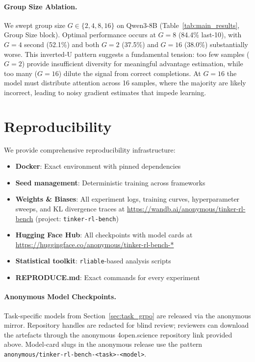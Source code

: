 \documentclass{article}
\begin{document}
\paragraph{Group Size Ablation.}
We swept group size $G \in \{2, 4, 8, 16\}$ on Qwen3-8B (Table~\ref{tab:main_results}, Group Size block).
Optimal performance occurs at $G{=}8$ (84.4\% last-10), with $G{=}4$ second (52.1\%) and both $G{=}2$ (37.5\%) and $G{=}16$ (38.0\%) substantially worse.
This inverted-U pattern suggests a fundamental tension: too few samples ($G{=}2$) provide insufficient diversity for meaningful advantage estimation, while too many ($G{=}16$) dilute the signal from correct completions.
At $G{=}16$ the model must distribute attention across 16 samples, where the majority are likely incorrect, leading to noisy gradient estimates that impede learning.

\section{Reproducibility}
\label{sec:reproducibility}

We provide comprehensive reproducibility infrastructure:
\begin{itemize}
    \item \textbf{Docker}: Exact environment with pinned dependencies
    \item \textbf{Seed management}: Deterministic training across frameworks
    \item \textbf{Weights \& Biases}: All experiment logs, training curves,
    hyperparameter sweeps, and KL divergence traces at
    \url{https://wandb.ai/anonymous/tinker-rl-bench}
    (project: \texttt{tinker-rl-bench})
    \item \textbf{Hugging Face Hub}: All checkpoints with model cards at
    \url{https://huggingface.co/anonymous/tinker-rl-bench-*}
    \item \textbf{Statistical toolkit}: \texttt{rliable}-based analysis scripts
    \item \textbf{REPRODUCE.md}: Exact commands for every experiment
\end{itemize}

\paragraph{Anonymous Model Checkpoints.}
Task-specific models from Section~\ref{sec:task_grpo} are released via the
anonymous mirror. Repository handles are redacted for blind review; reviewers
can download the artefacts through the anonymous 4open.science repository
link provided above. Model-card slugs in the anonymous release use the
pattern \texttt{anonymous/tinker-rl-bench-<task>-<model>}.
\end{document}

